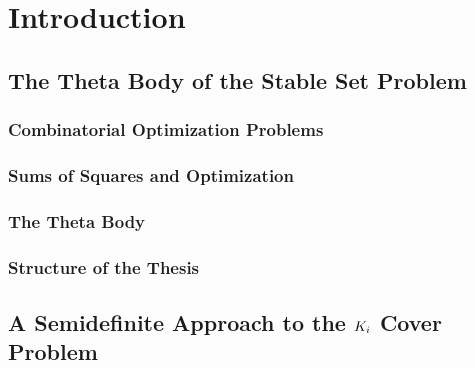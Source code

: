 


\chapter{Introduction}
\label{chap:Introduction}

\section{The Theta Body of the Stable Set Problem}

\subsection{Combinatorial Optimization Problems}

\subsection{Sums of Squares and Optimization}

\subsection{The Theta Body}

\subsection{Structure of the Thesis}

\section{A Semidefinite Approach to the $K_\MakeLowercase{i}$ Cover Problem}


